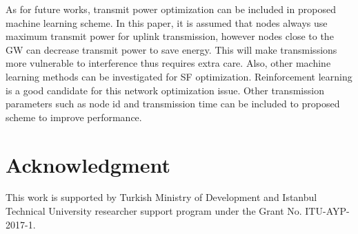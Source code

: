 \documentclass[conference]{IEEEtran}
\begin{document}
\par As for future works, transmit power optimization can be included in proposed machine learning scheme. In this paper, it is assumed that nodes always use maximum transmit power for uplink transmission, however nodes close to the GW can decrease transmit power to save energy. This will make transmissions more vulnerable to interference thus requires extra care. Also, other machine learning methods can be investigated for SF optimization. Reinforcement learning is a good candidate for this network optimization issue. Other transmission parameters such as node id and transmission time can be included to proposed scheme to improve performance.


\section*{Acknowledgment}
\par This work is supported by Turkish Ministry of Development and Istanbul Technical University researcher support program under the Grant No. ITU-AYP-2017-1.




\end{document}
